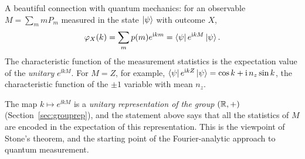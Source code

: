 A beautiful connection with quantum mechanics: for an observable $M=\sum_mmP_m$ measured in the state $\left|\psi\right\rangle$ with outcome $X$,
\[
  \varphi_X(k)=\sum_mp(m)e^{\mathrm{i} km}=\left\langle\psi\right| e^{\mathrm{i} kM}\left|\psi\right\rangle .
\]
The characteristic function of the measurement statistics is the expectation value of the \emph{unitary} $e^{\ii kM}$. For $M=Z$, for example, $\left\langle\psi\right| e^{\mathrm{i} kZ}\left|\psi\right\rangle=\cos k+\mathrm{i}\,n_z\sin k$, the characteristic function of the $\pm1$ variable with mean $n_z$.

\begin{lookahead}
  The map $k\mapsto e^{\ii kM}$ is a \emph{unitary representation of the group} $(\mathbb{R},+)$ (Section~\ref{sec:grouprep}), and the statement above says that all the statistics of $M$ are encoded in the expectation of this representation. This is the viewpoint of Stone's theorem, and the starting point of the
  Fourier-analytic approach to quantum measurement.
\end{lookahead}

